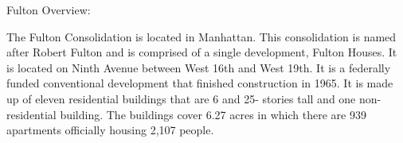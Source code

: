 Fulton Overview:     

   

The Fulton Consolidation is located in Manhattan. This consolidation is named after Robert Fulton and is comprised of a single development, Fulton Houses. It is located on Ninth Avenue between West 16th and West 19th. It is a federally funded conventional development that finished construction in 1965. It is made up of eleven residential buildings that are 6 and 25- stories tall and one non-residential building. The buildings cover 6.27 acres in which there are 939 apartments officially housing 2,107 people. 